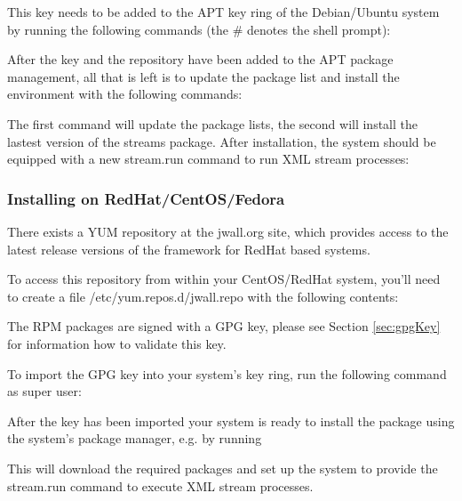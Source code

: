 This key needs to be added to the APT key ring of the Debian/Ubuntu
system by running the following commands (the {\ttfamily \#} denotes
the shell prompt):


After the key and the repository have been added to the APT package
management, all that is left is to update the package list and install
the \streams environment with the following commands:


The first command will update the package lists, the second will install
the lastest version of the {\ttfamily streams} package. After installation,
the system should be equipped with a new {\ttfamily stream.run} command
to run XML stream processes:


\subsubsection{\label{sec:installRPM}Installing on RedHat/CentOS/Fedora}
There exists a YUM repository at the {\ttfamily jwall.org} site, which
provides access to the latest release versions of the \streams framework
for RedHat based systems.

To access this repository from within your CentOS/RedHat system,
you'll need to create a file {\ttfamily /etc/yum.repos.d/jwall.repo}
with the following contents:


The RPM packages are signed with a GPG key, please see Section
\ref{sec:gpgKey} for information how to validate this key.

To import the GPG key into your system's key ring, run the
following command as super user:


After the key has been imported your system is ready to install
the \streams package using the system's package manager, e.g.
by running


This will download the required packages and set up the system
to provide the {\ttfamily stream.run} command to execute XML
stream processes.